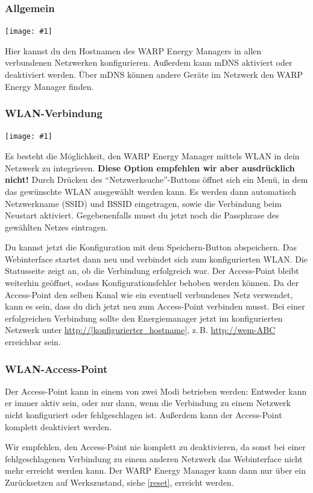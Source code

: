 \documentclass[a4paper,10pt]{article}
\newcommand{\hint}[1]{\begin{tcolorbox}[colback=boxgray,colframe=black,coltext=
white,title=Hinweis,left*=2mm,right*=2mm,boxsep=1mm,bottom=1mm,top=1mm]#1\end{tcolorbox}}
\newcommand{\gfx}[1]{\texttt{[image: \#1]}}
\begin{document}
\begin{multicols*}{2}
	\subsubsection{Allgemein}

	\gfx{./img/resized/web_network}

	Hier kannst du den Hostnamen des WARP Energy Managers in allen verbundenen Netzwerken konfigurieren. Außerdem kann mDNS aktiviert oder deaktiviert werden.
	Über mDNS können andere Geräte im Netzwerk den WARP Energy Manager finden.


	\subsubsection{WLAN-Verbindung}
	\gfx{./img/resized/web_wifi_sta}

	Es besteht die Möglichkeit, den WARP Energy Manager mittels WLAN in dein Netzwerk
	zu integrieren. \textbf{Diese Option empfehlen wir aber ausdrücklich
	nicht!}
	Durch Drücken des \enquote{Netzwerksuche}-Buttons öffnet sich ein Menü, in dem das gewünschte WLAN ausgewählt werden kann.
	Es werden dann automatisch Netzwerkname (SSID) und BSSID eingetragen, sowie die Verbindung beim Neustart aktiviert.
	Gegebenenfalls musst du jetzt noch die Passphrase des gewählten Netzes eintragen.

	Du kannst jetzt die Konfiguration mit dem Speichern-Button abspeichern.
	Das Webinterface startet dann neu und verbindet sich zum konfigurierten WLAN. Die Statusseite zeigt
	an, ob die Verbindung erfolgreich war. Der Access-Point bleibt weiterhin
	geöffnet, sodass Konfigurationsfehler behoben werden können.
	Da der Access-Point den selben Kanal wie ein eventuell verbundenes Netz verwendet,
	kann es sein, dass du dich jetzt neu zum Access-Point verbinden musst. Bei einer erfolgreichen Verbindung sollte den Energiemanager jetzt im konfigurierten Netzwerk unter
	\url{http://[konfigurierter_hostname]}, z.\,B. \url{http://wem-ABC} erreichbar sein.

	\subsubsection{WLAN-Access-Point}

	Der Access-Point kann in einem von zwei Modi betrieben werden: Entweder kann er immer aktiv sein,
	oder nur dann, wenn die Verbindung zu einem Netzwerk nicht konfiguriert oder fehlgeschlagen ist.
	Außerdem kann der Access-Point komplett deaktiviert werden.

	\hint{Wir empfehlen, den Access-Point nie komplett zu deaktivieren, da sonst bei einer
		fehlgeschlagenen Verbindung zu einem anderen Netzwerk das Webinterface nicht mehr erreicht
		werden kann. Der WARP Energy Manager kann dann nur über ein Zurücksetzen auf Werkszustand, siehe \ref{reset}, erreicht werden.}


\end{multicols*}
\end{document}
